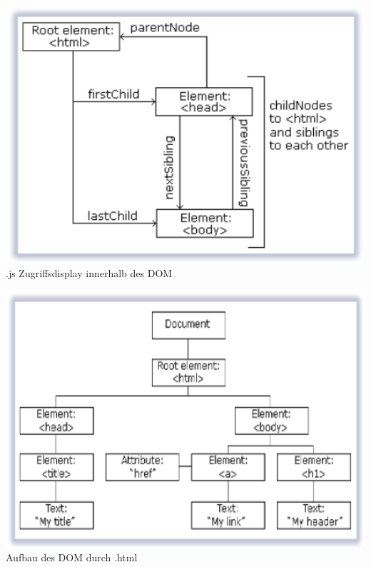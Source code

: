 \documentclass[11pt]{article}
\begin{document}
\begin{enumerate}[\thesection .1]
        \begin{minipage}{0.5\textwidth}
            \includegraphics[width=1\textwidth]{DOM_js.png}
            .js Zugriffsdisplay innerhalb des DOM
        \end{minipage}
        \begin{minipage}{0.5\textwidth}
            \includegraphics[width=1\textwidth]{DOM_html.png}
            Aufbau des DOM durch .html
        \end{minipage}
    \end{enumerate}
\end{document}
